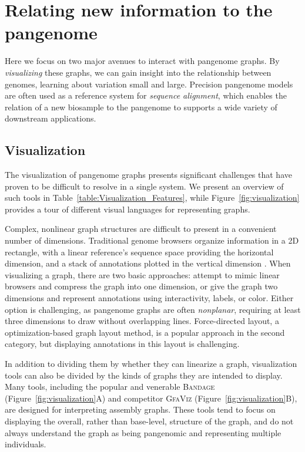 \section{Relating new information to the pangenome}

Here we focus on two major avenues to interact with pangenome graphs.
By \emph{visualizing} these graphs, we can gain insight into the relationship between genomes, learning about variation small and large.
Precision pangenome models are often used as a reference system for \emph{sequence alignment}, which enables the relation of a new biosample to the pangenome to supports a wide variety of downstream applications.

\subsection{Visualization}


The visualization of pangenome graphs presents significant challenges that have proven to be difficult to resolve in a single system.
We present an overview of such tools in Table~\ref{table:Visualization_Features}, while Figure~\ref{fig:visualization} provides a tour of different visual languages for representing graphs.

Complex, nonlinear graph structures are difficult to present in a convenient number of dimensions.
Traditional genome browsers organize information in a 2D rectangle, with a linear reference's sequence space providing the horizontal dimension, and a stack of annotations plotted in the vertical dimension \cite{Haeussler_2018}.
When visualizing a graph, there are two basic approaches: attempt to mimic linear browsers and compress the graph into one dimension, or give the graph two dimensions and represent annotations using interactivity, labels, or color.
Either option is challenging, as pangenome graphs are often \emph{nonplanar}, requiring at least three dimensions to draw without overlapping lines.
Force-directed layout, a optimization-based graph layout method, is a popular approach in the second category, but displaying annotations in this layout is challenging.

In addition to dividing them by whether they can linearize a graph, visualization tools can also be divided by the kinds of graphs they are intended to display. 
Many tools, including the popular and venerable \textsc{Bandage} \citep{Wick_2015} (Figure~\ref{fig:visualization}A) and competitor \textsc{GfaViz} \cite{Gonnella_2018} (Figure~\ref{fig:visualization}B), are designed for interpreting assembly graphs. 
These tools tend to focus on displaying the overall, rather than base-level, structure of the graph, and do not always understand the graph as being pangenomic and representing multiple individuals.

